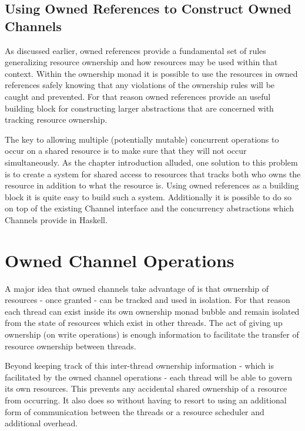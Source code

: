 \documentclass[onehalf,11pt]{beavtex}
\begin{document}
\subsection{Using Owned References to Construct Owned Channels}

As discussed earlier, owned references provide a fundamental set of
rules generalizing resource ownership and how resources may be used within that
context.  Within the ownership monad it is possible to use the
resources in owned references safely knowing that any violations of
the ownership rules will be caught and prevented.  For that reason
owned references provide an useful building block for constructing
larger abstractions that are concerned with tracking resource ownership.

The key to allowing multiple (potentially mutable) concurrent operations to occur
on a shared resource is to make sure that they will not occur simultaneously.
As the chapter introduction alluded, one solution to this problem is to
create a system for shared access to resources that tracks both who owns the
resource in addition to what the resource is.
Using owned references as a building block it is quite easy to build
such a system. Additionally it is possible to do so on top of the existing
Channel interface and the concurrency abstractions which Channels provide in
Haskell.


\section{Owned Channel Operations}

A major idea that owned channels take advantage of is that ownership
of resources - once granted - can be tracked and used in isolation. For that reason
each thread can exist inside its own ownership monad bubble and
remain isolated from the state of resources which exist in other threads.
The act of giving up ownership  (on write operations) is enough information to
facilitate the transfer of resource ownership between threads.

Beyond keeping track of this inter-thread ownership information - which is
facilitated by the owned channel operations - each thread will be able
to govern its own resources.  This prevents any accidental shared ownership of
a resource from occurring. It also does so without having to resort to using an
additional form of communication between the threads or a resource scheduler and
additional overhead. 
\end{document}
